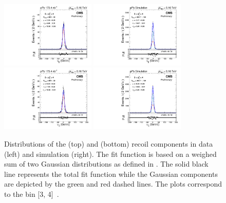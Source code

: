 \begin{figure}[htb!]
 \centering
 \includegraphics[width=0.4\textwidth]{Figures/WBoson/Analysis/Correction/Recoil/RecoilFits/Data/pfu1fit_2.pdf}
 \includegraphics[width=0.4\textwidth]{Figures/WBoson/Analysis/Correction/Recoil/RecoilFits/MC/pfu1fit_2.pdf} \\
 \includegraphics[width=0.4\textwidth]{Figures/WBoson/Analysis/Correction/Recoil/RecoilFits/Data/pfu2fit_2.pdf}
 \includegraphics[width=0.4\textwidth]{Figures/WBoson/Analysis/Correction/Recoil/RecoilFits/MC/pfu2fit_2.pdf}
 \caption{Distributions of the \utpar (top) and \utper (bottom) recoil components in data (left) and simulation (right). The fit function is based on a weighed sum of two Gaussian distributions as defined in . The solid black line represents the total fit function while the Gaussian components are depicted by the green and red dashed lines. The plots correspond to the \qtZ bin [3, 4]~\GeVc.}
 \label{fig:RecoilFits}
\end{figure}

